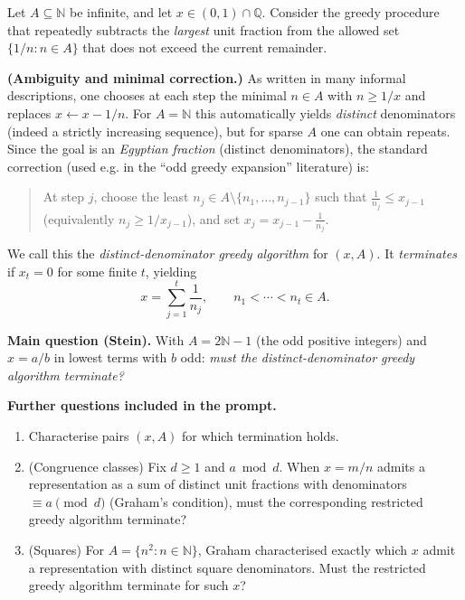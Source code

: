 Let $A\subseteq \mathbb{N}$ be infinite, and let $x\in(0,1)\cap\mathbb{Q}$. Consider the greedy procedure that repeatedly subtracts the \emph{largest} unit fraction from the allowed set $\{1/n : n\in A\}$ that does not exceed the current remainder.

\medskip
\noindent\textbf{(Ambiguity and minimal correction.)}
As written in many informal descriptions, one chooses at each step the minimal $n\in A$ with $n\ge 1/x$ and replaces $x\leftarrow x-1/n$. For $A=\mathbb{N}$ this automatically yields \emph{distinct} denominators (indeed a strictly increasing sequence), but for sparse $A$ one can obtain repeats. Since the goal is an \emph{Egyptian fraction} (distinct denominators), the standard correction (used e.g. in the ``odd greedy expansion'' literature) is:

\begin{quote}
At step $j$, choose the least $n_j\in A\setminus\{n_1,\dots,n_{j-1}\}$ such that $\frac1{n_j}\le x_{j-1}$ (equivalently $n_j\ge 1/x_{j-1}$), and set $x_j=x_{j-1}-\frac1{n_j}$.
\end{quote}
We call this the \emph{distinct-denominator greedy algorithm} for $(x,A)$. It \emph{terminates} if $x_t=0$ for some finite $t$, yielding
\[
 x=\sum_{j=1}^t \frac1{n_j},\qquad n_1<\cdots<n_t\in A.
\]

\medskip
\noindent\textbf{Main question (Stein).}
With $A=2\mathbb{N}-1$ (the odd positive integers) and $x=a/b$ in lowest terms with $b$ odd: \emph{must the distinct-denominator greedy algorithm terminate?}

\medskip
\noindent\textbf{Further questions included in the prompt.}
\begin{enumerate}[label=(\alph*)]
\item Characterise pairs $(x,A)$ for which termination holds.
\item (Congruence classes) Fix $d\ge 1$ and $a\bmod d$. When $x=m/n$ admits a representation as a sum of distinct unit fractions with denominators $\equiv a\pmod d$ (Graham's condition), must the corresponding restricted greedy algorithm terminate?
\item (Squares) For $A=\{n^2:n\in\mathbb{N}\}$, Graham characterised exactly which $x$ admit a representation with distinct square denominators. Must the restricted greedy algorithm terminate for such $x$?
\end{enumerate}
